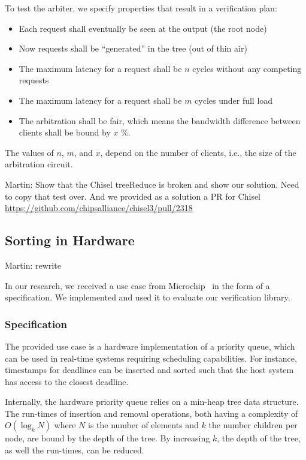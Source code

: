 \documentclass[conference]{IEEEtran}
\newcommand{\martin}[1]{{\color{blue} Martin: #1}}
\begin{document}
To test the arbiter, we specify properties that result in a verification plan:

\begin{itemize}
\item Each request shall eventually be seen at the output (the root node)
\item Now requests shall be ``generated'' in the tree (out of thin air)
\item The maximum latency for a request shall be $n$ cycles without any competing requests
\item The maximum latency for a request shall be $m$ cycles under full load
\item The arbitration shall be fair, which means the bandwidth difference between clients shall be bound by $x$ \%.
\end{itemize}

The values of $n$, $m$, and $x$, depend on the number of clients, i.e., the size of the arbitration
circuit.

\martin{Show that the Chisel treeReduce is broken and show our solution. Need to copy that test
over. And we provided as a solution a PR for Chisel \url{https://github.com/chipsalliance/chisel3/pull/2318}}



\subsection{Sorting in Hardware}

\martin{rewrite}


In our research, we received a use case from Microchip~\cite{microchip} in the form of a specification.
We implemented and used it to evaluate our verification library.

\subsubsection{Specification}

The provided use case is a hardware implementation of a priority queue, which can be used in real-time systems requiring scheduling capabilities. 
For instance, timestamps for deadlines can be inserted and sorted such that the host system has access to the closest deadline.

Internally, the hardware priority queue relies on a min-heap tree data structure. 
The run-times of insertion and removal operations, both having a complexity of $O(\log_k N)$ where $N$ is the number of elements and $k$ the number children per node, are bound by the depth of the tree. 
By increasing $k$, the depth of the tree, as well the run-times, can be reduced.
\end{document}
